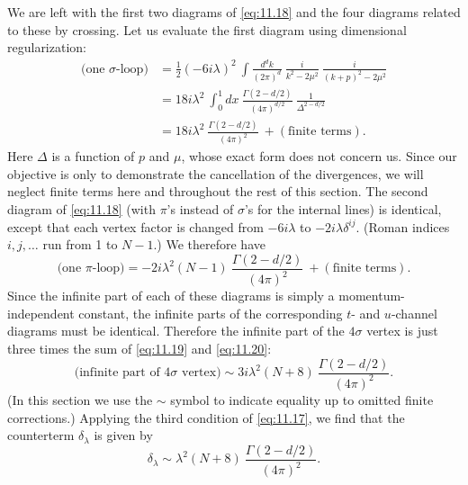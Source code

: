 We are left with the first two diagrams of \eqref{eq:11.18} and the four
diagrams related to these by crossing.  Let us evaluate the first diagram
using dimensional regularization:
\begin{equation}
  \begin{aligned}
    \text{(one $\sigma$-loop)} &= \frac{1}{2}(-6i\lambda)^2\ \int
      \frac{d^dk}{(2\pi)^d}\ \frac{i}{k^2-2\mu^2}\ \frac{i}{(k+p)^2-2\mu^2}\\
    &= 18i\lambda^2\ \int_0^1 dx\ \frac{\Gamma(2-d/2)}{(4\pi)^{d/2}}\
      \frac{1}{\Delta^{2-d/2}}\\
    &= 18i\lambda^2\ \frac{\Gamma(2-d/2)}{(4\pi)^2}\ + (\text{finite terms}).
  \end{aligned}
  \label{eq:11.19}
\end{equation}
Here $\Delta$ is a function of $p$ and $\mu$, whose exact form does not
concern us.  Since our objective is only to demonstrate the cancellation of
the divergences, we will neglect finite terms here and throughout the rest of
this section.  The second diagram of \eqref{eq:11.18} (with $\pi$'s instead
of $\sigma$'s for the internal lines) is identical, except that each vertex
factor is changed from $-6i\lambda$ to $-2i\lambda\delta^{ij}$.  (Roman
indices $i, j, \ldots$ run from 1 to $N-1$.)  We therefore have
\begin{equation}
  \text{(one $\pi$-loop)} = -2i\lambda^2(N-1)\ \frac{\Gamma(2-d/2)}
    {(4\pi)^2}\ + (\text{finite terms}) .
  \label{eq:11.20}
\end{equation}
Since the infinite part of each of these diagrams is simply a
momentum-independent constant, the infinite parts of the corresponding $t$-
and $u$-channel diagrams must be identical.  Therefore the infinite part of
the $4\sigma$ vertex is just three times the sum of \eqref{eq:11.19} and
\eqref{eq:11.20}:
\begin{equation}
  \text{(infinite part of } 4\sigma \text{ vertex)} \sim 3i\lambda^2(N+8)\
    \frac{\Gamma(2-d/2)}{(4\pi)^2} .
  \label{eq:11.21}
\end{equation}
(In this section we use the $\sim$ symbol to indicate equality up to omitted
finite corrections.)  Applying the third condition of \eqref{eq:11.17}, we
find that the counterterm $\delta_\lambda$ is given by
\begin{equation}
  \delta_\lambda \sim \lambda^2(N+8)\ \frac{\Gamma(2-d/2)}{(4\pi)^2} .
  \label{eq:11.22}
\end{equation}

